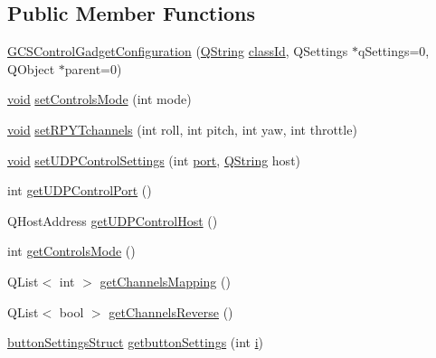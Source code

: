 \subsection*{\-Public \-Member \-Functions}
\begin{DoxyCompactItemize}
\item 
\hyperlink{group___g_c_s_control_gadget_plugin_ga564a596fece84d06f7a2ff0f9151d140}{\-G\-C\-S\-Control\-Gadget\-Configuration} (\hyperlink{group___u_a_v_objects_plugin_gab9d252f49c333c94a72f97ce3105a32d}{\-Q\-String} \hyperlink{group___core_plugin_gac953657221ba7fda967ada0408332641}{class\-Id}, \-Q\-Settings $\ast$q\-Settings=0, \-Q\-Object $\ast$parent=0)
\item 
\hyperlink{group___u_a_v_objects_plugin_ga444cf2ff3f0ecbe028adce838d373f5c}{void} \hyperlink{group___g_c_s_control_gadget_plugin_gaa1642ff7af92b8b9805e2f4ec1e55e05}{set\-Controls\-Mode} (int mode)
\item 
\hyperlink{group___u_a_v_objects_plugin_ga444cf2ff3f0ecbe028adce838d373f5c}{void} \hyperlink{group___g_c_s_control_gadget_plugin_ga60a55663d33c0fa8ede8a318f08fc639}{set\-R\-P\-Y\-Tchannels} (int roll, int pitch, int yaw, int throttle)
\item 
\hyperlink{group___u_a_v_objects_plugin_ga444cf2ff3f0ecbe028adce838d373f5c}{void} \hyperlink{group___g_c_s_control_gadget_plugin_ga3bcc78712b1d750a1426bd1342f0897a}{set\-U\-D\-P\-Control\-Settings} (int \hyperlink{classport}{port}, \hyperlink{group___u_a_v_objects_plugin_gab9d252f49c333c94a72f97ce3105a32d}{\-Q\-String} host)
\item 
int \hyperlink{group___g_c_s_control_gadget_plugin_gab4759362f125b28eca65edb170d6d179}{get\-U\-D\-P\-Control\-Port} ()
\item 
\-Q\-Host\-Address \hyperlink{group___g_c_s_control_gadget_plugin_ga3d756308c4f352759b919076507be2de}{get\-U\-D\-P\-Control\-Host} ()
\item 
int \hyperlink{group___g_c_s_control_gadget_plugin_ga4604101049b278a5e919fa1bcbba4a74}{get\-Controls\-Mode} ()
\item 
\-Q\-List$<$ int $>$ \hyperlink{group___g_c_s_control_gadget_plugin_gad8ea955332edf856259dc191fdca5473}{get\-Channels\-Mapping} ()
\item 
\-Q\-List$<$ bool $>$ \hyperlink{group___g_c_s_control_gadget_plugin_ga643521630f66ed868de507d649278971}{get\-Channels\-Reverse} ()
\item 
\hyperlink{structbutton_settings_struct}{button\-Settings\-Struct} \hyperlink{group___g_c_s_control_gadget_plugin_ga024292274c2307cd9e45e6a7fbbba208}{getbutton\-Settings} (int \hyperlink{uavobjecttemplate_8m_a6f6ccfcf58b31cb6412107d9d5281426}{i})

\end{DoxyCompactItemize}
